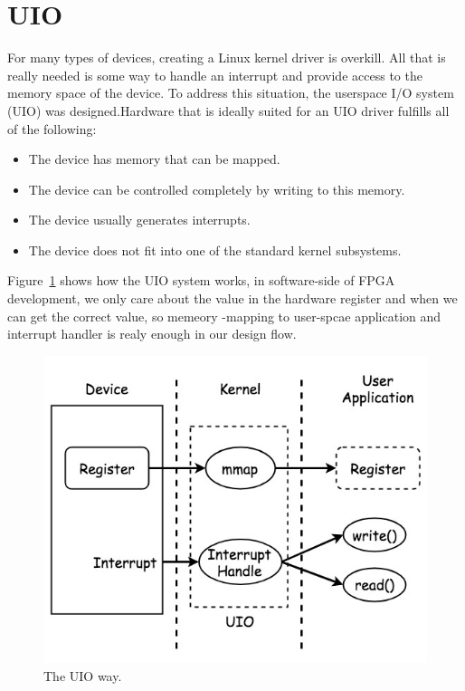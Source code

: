 \section{UIO}
\label{sec:UIO}
For many types of devices, creating a Linux kernel driver is overkill. All that is really needed 
is some way to handle an interrupt and provide access to the memory space of the device. To address 
this situation, the userspace I/O system (UIO) was designed.Hardware that is ideally suited for an 
UIO driver fulfills all of the following:
%
\begin{itemize}
\item The device has memory that can be mapped.
\item The device can be controlled completely by writing to this memory.
\item The device usually generates interrupts.
\item The device does not fit into one of the standard kernel subsystems.
\end{itemize}
%
Figure~\ref{fig:UIO Driver} shows how the UIO system works, in software-side of FPGA development, we 
only care about the value in the hardware register and when we can get the correct value, so memeory
-mapping to user-spcae application and interrupt handler is realy enough in our design flow.  
%
\begin{figure}[!htb]
  \centering
  \includegraphics[scale=0.5]{images/uio.jpg}
  \caption[The UIO way.]{The UIO way.}
  \label{fig:UIO Driver}
\end{figure}

